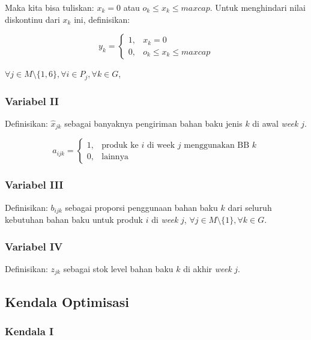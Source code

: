 \documentclass[
  12pt,
]{article}
\begin{document}
Maka kita bisa tuliskan: \(x_k = 0\) atau \(o_k \leq x_k \leq maxcap\).
Untuk menghindari nilai diskontinu dari \(x_k\) ini, definisikan:

\[y_k = \left\{\begin{matrix}
1, & x_k = 0 \\ 0, & o_k \leq x_k \leq maxcap
\end{matrix}\right.\]

\(\forall j \in M \setminus \{1,6\}, \forall i \in P_j, \forall k \in G\),

\hypertarget{variabel-ii}{%
\subsubsection*{Variabel II}\label{variabel-ii}}

Definisikan: \(\hat{x}_{jk}\) sebagai banyaknya pengiriman bahan baku
jenis \(k\) di awal \emph{week} \(j\).

\[a_{ijk} = \left\{\begin{matrix}
1, & \text{produk ke } i \text{ di week } j \text{ menggunakan BB } k \\ 
0, & \text{lainnya}
\end{matrix}\right.\]

\hypertarget{variabel-iii}{%
\subsubsection*{Variabel III}\label{variabel-iii}}

Definisikan: \(b_{ijk}\) sebagai proporsi penggunaan bahan baku \(k\)
dari seluruh kebutuhan bahan baku untuk produk \(i\) di \emph{week}
\(j\), \(\forall j \in M \setminus \{ 1 \}, \forall k \in G\).

\hypertarget{variabel-iv}{%
\subsubsection*{Variabel IV}\label{variabel-iv}}

Definisikan: \(z_{jk}\) sebagai stok level bahan baku \(k\) di akhir
\emph{week} \(j\).

\hypertarget{kendala-optimisasi}{%
\subsection{Kendala Optimisasi}\label{kendala-optimisasi}}

\hypertarget{kendala-i}{%
\subsubsection*{Kendala I}\label{kendala-i}}
\end{document}
